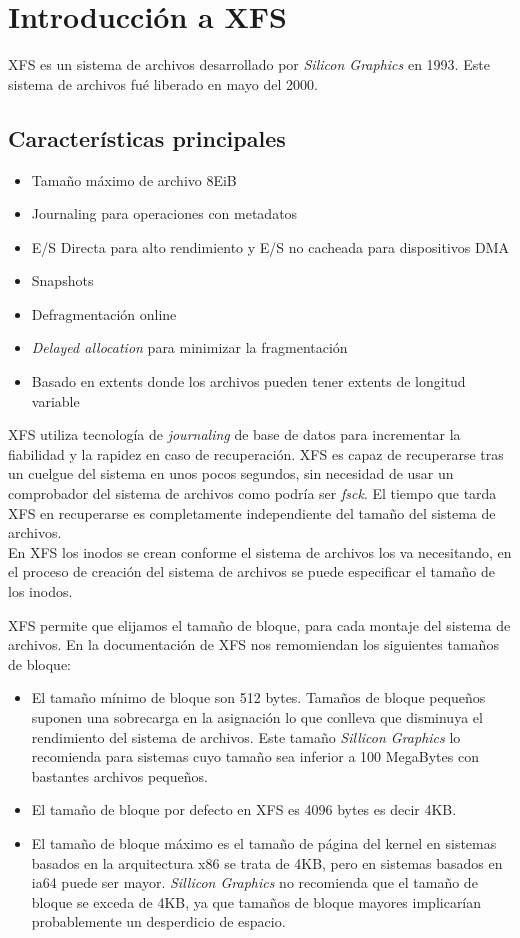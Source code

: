\section{Introducción a XFS}
XFS es un sistema de archivos desarrollado por \textit{Silicon Graphics} en 1993. Este sistema de archivos fué liberado en mayo del 2000.

\subsection{Características principales}
\begin{itemize}
    \item Tamaño máximo de archivo 8EiB
    \item Journaling para operaciones con metadatos
    \item E/S Directa para alto rendimiento y E/S no cacheada para dispositivos DMA
    \item Snapshots
    \item Defragmentación online
    \item \textit{Delayed allocation} para minimizar la fragmentación
    \item Basado en extents donde los archivos pueden tener extents de longitud variable
\end{itemize}

XFS utiliza tecnología de \textit{journaling} de base de datos para incrementar la fiabilidad y la rapidez en caso de recuperación. XFS es capaz de recuperarse tras un cuelgue del sistema en unos pocos segundos, sin necesidad de usar un comprobador del sistema de archivos como podría ser \textit{fsck}. El tiempo que tarda XFS en recuperarse es completamente independiente del tamaño del sistema de archivos.\\

En XFS los inodos se crean conforme el sistema de archivos los va necesitando, en el proceso de creación del sistema de archivos se puede especificar el tamaño de los inodos.

XFS permite que elijamos el tamaño de bloque, para cada montaje del sistema de archivos. En la documentación de XFS nos remomiendan los siguientes tamaños de bloque:
\begin{itemize}
    \item El tamaño mínimo de bloque son 512 bytes. Tamaños de bloque pequeños suponen una sobrecarga en la asignación lo que conlleva que disminuya el rendimiento del sistema de archivos. Este tamaño \textit{Sillicon Graphics} lo recomienda para sistemas cuyo tamaño sea inferior a 100 MegaBytes con bastantes archivos pequeños.
    
    \item El tamaño de bloque por defecto en XFS es 4096 bytes es decir 4KB.
    \item El tamaño de bloque máximo es el tamaño de página del kernel en sistemas basados en la arquitectura x86 se trata de 4KB, pero en sistemas basados en ia64 puede ser mayor. \textit{Sillicon Graphics} no recomienda que el tamaño de bloque se exceda de 4KB, ya que tamaños de bloque mayores implicarían probablemente un desperdicio de espacio.
\end{itemize}

